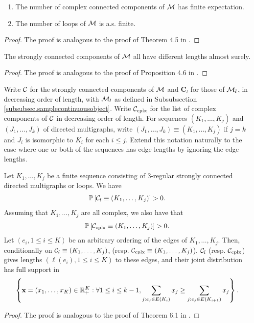 \begin{corollary}
\begin{enumerate}
    \item The number of complex connected components of ${\mathcal M}$ has finite expectation.
    \item The number of loops of ${\mathcal M}$ is a.s. finite.
\end{enumerate}
\end{corollary}
\begin{proof}
The proof is analogous to the proof of Theorem 4.5 in \cite{Goldschmidt2019}.
\end{proof}
\begin{corollary}\label{cor.allengthsaredifferent}
The strongly connected components of ${\mathcal M}$ all have different lengths almost surely.
\end{corollary}
\begin{proof}
The proof is analogous to the proof of Proposition 4.6 in \cite{Goldschmidt2019}.
\end{proof}
Write ${\mathcal C}$ for the strongly connected components of ${\mathcal M}$ and $\mathbf{C}_l$ for those of ${\mathcal M}_l$, in decreasing order of length, with ${\mathcal M}_l$ as defined in Subsubsection  \ref{subsubsec.samplecontinuousobject}. Write ${\mathcal C}_{\text{cplx}}$ for the list of complex components of ${\mathcal C}$ in decreasing order of length. For sequences $(K_1,\dots, K_j)$ and $(J_1,\dots,J_k)$ of directed multigraphs, write $(J_1,\dots,J_k)\equiv(K_1,\dots, K_j)$ if $j=k$ and $J_i$ is isomorphic to $K_i$ for each $i\leq j$. Extend this notation naturally to the case where one or both of the sequences has edge lengths by ignoring the edge lengths. 
\begin{corollary}
Let $K_1,\dots, K_j$ be a finite sequence consisting of $3$-regular strongly connected directed multigraphs or loops. We have 
$${\mathbb P}\left[{\mathcal C}_l\equiv(K_1,\dots, K_j)\right]>0.$$
Assuming that $K_1,\dots, K_j$ are all complex, we also have that 
$${\mathbb P}\left[ {\mathcal C}_{\text{cplx}}\equiv(K_1,\dots, K_j)\right]>0.$$
Let $(e_i,1\leq i \leq K)$ be an arbitrary ordering of the edges of $K_1,\dots, K_j$. Then, conditionally on ${\mathcal C}_l\equiv(K_1,\dots, K_j)$, (resp. ${\mathcal C}_{\text{cplx}}\equiv(K_1,\dots, K_j)$), ${\mathcal C}_l$ (resp. ${\mathcal C}_{\text{cplx}}$) gives lengths $(\ell(e_i),1\leq i \leq K)$ to these edges, and their joint distribution has full support in 
$$\left\{\mathbf{x}=(x_1,\dots, x_K)\in {\mathbb R}_+^K:\forall 1\leq i\leq k-1, \sum_{j:e_j\in E(K_i)}x_j \geq \sum_{j:e_j\in E(K_{i+1})}x_j\right\}.$$
\end{corollary}
\begin{proof}
The proof is analogous to the proof of Theorem 6.1 in \cite{Goldschmidt2019}.
\end{proof}

